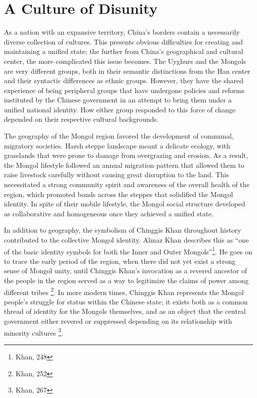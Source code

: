 \section{A Culture of Disunity}


As a nation with an expansive territory, China's borders contain a necessarily
diverse collection of cultures. This presents obvious difficulties for
creating and maintaining a unified state; the further from China's
geographical and cultural center, the more complicated this issue becomes. The
Uyghurs and the Mongols are very different groups, both in their semantic
distinctions from the Han center and their syntactic differences as ethnic
groups.  However, they have the shared experience of being peripheral groups
that have undergone policies and reforms instituted by the Chinese government
in an attempt to bring them under a unified national identity. How either group
responded to this force of change depended on their respective cultural
backgrounds.

The geography of the Mongol region favored the development of communal,
migratory societies. Harsh steppe landscape meant a delicate ecology,
with grasslands that were prone to damage from overgrazing and erosion. As a
result, the Mongol lifestyle followed an annual migration pattern that allowed
them to raise livestock carefully without causing great disruption to the
land. This necessitated a strong community spirit and awareness of the
overall health of the region, which promoted bonds across the steppes that solidified the Mongol
identity. In spite of their mobile lifestyle, the Mongol social structure
developed as collaborative and homogeneous once they achieved a unified state.

In addition to geography, the symbolism of
Chinggis Khan throughout history contributed to the collective Mongol identity.
Almaz Khan describes this as ``one of the basic identity symbols for both the
Inner and Outer Mongols''\footnote{Khan,
248}. He goes on to trace the early period of the region, when there did
not yet exist a strong sense of Mongol unity, until Chinggis Khan's invocation as a
revered ancestor of the people in the region served as a way to legitimize the
claims of power among different tribes \footnote{Khan, 252}. In more modern
times, Chinggis Khan represents the Mongol people's struggle for status within
the Chinese state; it exists both as a common thread of identity for the
Mongols themselves, and as an object that the central government either revered
or suppressed depending on its relationship with minority cultures
\footnote{Khan, 267}.

